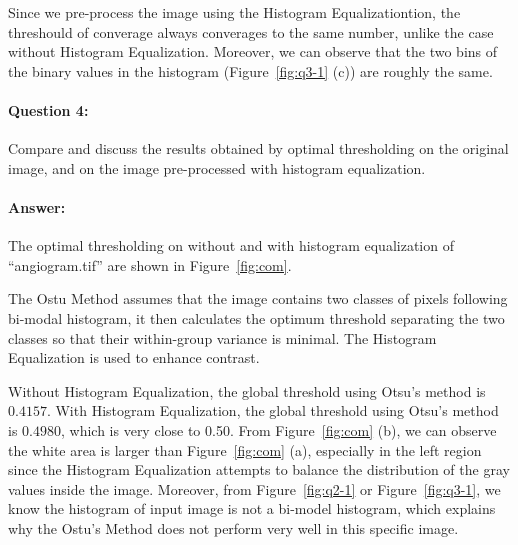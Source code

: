 \documentclass[12pt, letter]{article}
\begin{document}
Since we pre-process the image using the Histogram Equalizationtion, the threshould of converage always converages to the same number, unlike the case without Histogram Equalization. Moreover, we can observe that the two bins of the binary values in the histogram (Figure~\ref{fig:q3-1} (c)) are roughly the same. 

\paragraph{Question 4: } Compare and discuss the results obtained by optimal thresholding on the original image, and on the image pre-processed with histogram equalization.

\paragraph{Answer: }

The optimal thresholding on without and with histogram equalization of ``angiogram.tif'' are shown in Figure~\ref{fig:com}. 

The Ostu Method assumes that the image contains two classes of pixels following bi-modal histogram, it then calculates the optimum threshold separating the two classes so that their within-group variance is minimal. The Histogram Equalization is used to enhance contrast.

Without Histogram Equalization, the global threshold using Otsu's method is $\mathbf{0.4157}$. With Histogram Equalization, the global threshold using Otsu's method is $\mathbf{0.4980}$, which is very close to 0.50. From 
Figure~\ref{fig:com} (b), we can observe the white area is larger than Figure~\ref{fig:com} (a), especially in the left region since the Histogram Equalization attempts to balance the distribution of the gray values inside the image. Moreover, from Figure~\ref{fig:q2-1} or Figure~\ref{fig:q3-1}, we know the histogram of input image is not a bi-model histogram, which explains why the Ostu's Method does not perform very well in this specific image.
\end{document}
